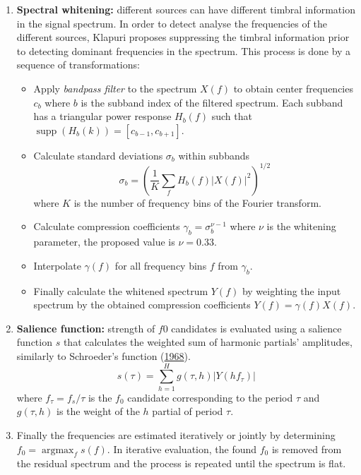 \documentclass[american,]{article}
\providecommand{\tightlist}{%
  \setlength{\itemsep}{0pt}\setlength{\parskip}{0pt}}
\begin{document}
\begin{enumerate}
\def\labelenumi{\arabic{enumi}.}
\tightlist
\item
  \textbf{Spectral whitening:} different sources can have
  different timbral information in the signal spectrum.
  In order to detect analyse the frequencies of the different
  sources, Klapuri proposes suppressing the timbral
  information prior to detecting dominant frequencies
  in the spectrum.
  This process is done by a sequence of transformations:

  \begin{itemize}
  \tightlist
  \item
    Apply \emph{bandpass filter} to the spectrum \(X(f)\)
    to obtain center frequencies \(c_b\) where \(b\) is
    the subband index of the filtered spectrum.
    Each subband has a triangular power response \(H_b(f)\)
    such that \(\mathop{\mathrm{supp}}\left(H_b(k)\right) = [c_{b-1},c_{b+1}]\).
  \item
    Calculate standard deviations \(\sigma_b\) within subbands
    \[\sigma_b=\left(\frac{1}{K}\sum_f H_b(f)\left\lvert X(f)\right\rvert^2\right)^{1/2}\]
    where \(K\) is the number of frequency bins of the Fourier transform.
  \item
    Calculate compression coefficients \(\gamma_b=\sigma_b^{\nu-1}\)
    where \(\nu\) is the whitening parameter, the proposed value is \(\nu=0.33\).
  \item
    Interpolate \(\gamma(f)\) for all frequency bins \(f\) from \(\gamma_b\).
  \item
    Finally calculate the whitened spectrum \(Y(f)\) by weighting
    the input spectrum by the obtained compression coefficients
    \(Y(f)=\gamma(f)X(f)\).
  \end{itemize}
\item
  \textbf{Salience function:} strength of \(f0\) candidates is evaluated
  using a salience function \(s\) that calculates the weighted sum
  of harmonic partials' amplitudes, similarly to Schroeder's function
  (\protect\hyperlink{ref-schroeder_period_1968}{1968}).
  \[s(\tau) = \sum_{h=1}^H g(\tau,h)\left\lvert Y(hf_{\tau})\right\rvert\]
  where \(f_{\tau}=f_s/\tau\) is the \(f_0\) candidate corresponding
  to the period \(\tau\) and \(g(\tau,h)\) is the weight of the
  \(h\) partial of period \(\tau\).
\item
  Finally the frequencies are estimated iteratively or jointly
  by determining \(f_0=\mathop{\mathrm{argmax}}_{f} s(f)\).
  In iterative evaluation, the found \(f_0\) is removed from the residual
  spectrum and the process is repeated until the spectrum is flat.
\end{enumerate}
\end{document}
